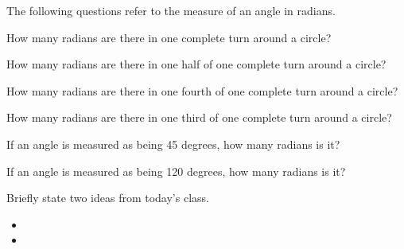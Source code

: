 \begin{problem}
\item The following questions refer to the measure of an angle in
  radians.
  \begin{subproblem}
  \item How many radians are there in one complete turn around a
    circle?
    \vfill
  \item How many radians are there in one half of one complete turn
    around a circle?  
    \vfill
  \item How many radians are there in one fourth of one complete turn
    around a circle?  
    \vfill
  \item How many radians are there in one third  of one complete turn
    around a circle?  
    \vfill
  \item If an angle is measured as being 45 degrees, how many radians
    is it?
    \vfill
  \item If an angle is measured as being 120 degrees, how many radians
    is it?
    \vfill
  \end{subproblem}

\end{problem}

\postClass

\begin{problem}
\item Briefly state two ideas from today's class.
  \begin{itemize}
  \item 
  \item 
  \end{itemize}
\item 
  \begin{subproblem}
    \item
  \end{subproblem}
\end{problem}



